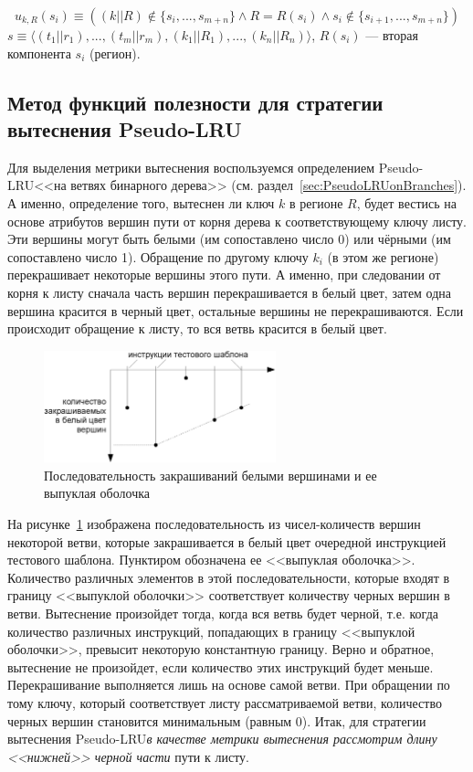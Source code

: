 \documentclass[14pt]{extreport}
\newcommand{\PseudoLRU}{\textsf{Pseudo-LRU}\xspace}
\begin{document}
$$u_{k,R}(s_i) \equiv ((k||R) \notin \{s_i, ..., s_{m+n}\} \wedge
R = R(s_i) \wedge s_i \notin\{s_{i+1},..., s_{m+n}\})$$
$s \equiv \langle (t_1||r_1), ..., (t_m||r_m), (k_1||R_1), ...,
(k_n||R_n)\rangle$, $R(s_i)$ --- вторая компонента $s_i$ (регион).


\subsection{Метод функций полезности для стратегии вытеснения \PseudoLRU}

Для выделения метрики вытеснения воспользуемся определением \PseudoLRU <<на
ветвях бинарного дерева>> (см. раздел~\ref{sec:PseudoLRUonBranches}). А именно,
определение того, вытеснен ли ключ $k$ в регионе $R$, будет вестись на основе
атрибутов вершин пути от корня дерева к соответствующему ключу листу. Эти
вершины могут быть белыми (им сопоставлено число 0) или чёрными (им сопоставлено
число 1). Обращение по другому ключу $k_i$ (в этом же регионе) перекрашивает
некоторые вершины этого пути. А именно, при следовании от корня к листу сначала
часть вершин перекрашивается в белый цвет, затем одна вершина красится в черный
цвет, остальные вершины не перекрашиваются. Если происходит обращение к листу,
то вся ветвь красится в белый цвет.

\begin{figure}[h] \center
  \includegraphics[width=0.6\textwidth]{2.theor/white_feeds}
  \caption{Последовательность закрашиваний белыми вершинами и ее выпуклая
оболочка}\label{fig:white-feeds}
\end{figure}

На рисунке~\ref{fig:white-feeds} изображена последовательность из
чисел-количеств вершин некоторой ветви, которые закрашивается в белый цвет
очередной инструкцией тестового шаблона. Пунктиром обозначена ее <<выпуклая
оболочка>>. Количество различных элементов в этой последовательности, которые
входят в границу <<выпуклой оболочки>> соответствует количеству черных вершин в
ветви. Вытеснение произойдет тогда, когда вся ветвь будет черной, т.е. когда
количество различных инструкций, попадающих в границу <<выпуклой оболочки>>,
превысит некоторую константную границу. Верно и обратное, вытеснение не
произойдет, если количество этих инструкций будет меньше. Перекрашивание
выполняется лишь на основе самой ветви. При обращении по тому ключу, который
соответствует листу рассматриваемой ветви, количество черных вершин становится
минимальным (равным 0). Итак, для стратегии вытеснения \PseudoLRU \emph{в
качестве метрики вытеснения рассмотрим длину <<нижней>> черной части} пути к
листу.
\end{document}
